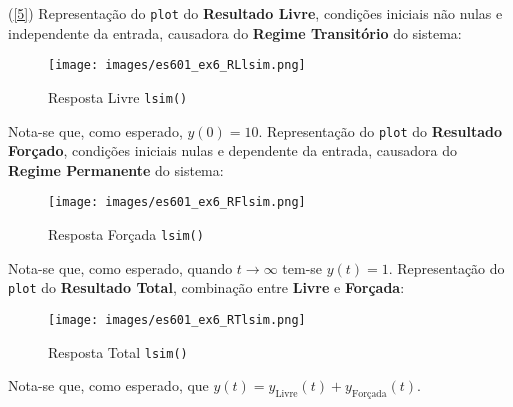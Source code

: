\documentclass{article}
\begin{document}
\begin{resolution}
\newpage
    (\ref{5}) Representação do \texttt{plot} do \textbf{Resultado Livre}, condições iniciais não nulas e independente da entrada, causadora do \textbf{Regime Transitório} do sistema:
    \begin{figure}[H]
        \centering
        \texttt{[image: images/es601\_ex6\_RLlsim.png]}
        \caption{Resposta Livre \texttt{lsim()}}
    \end{figure}
    Nota-se que, como esperado, $y(0) = 10$. Representação do \texttt{plot} do \textbf{Resultado Forçado}, condições iniciais nulas e dependente da entrada, causadora do \textbf{Regime Permanente} do sistema:
    \begin{figure}[H]
        \centering
        \texttt{[image: images/es601\_ex6\_RFlsim.png]}
        \caption{Resposta Forçada \texttt{lsim()}}
    \end{figure}
    Nota-se que, como esperado, quando $t\to\infty$ tem-se $y(t) = 1$. Representação do \texttt{plot} do \textbf{Resultado Total}, combinação entre \textbf{Livre} e \textbf{Forçada}:
    \begin{figure}[H]
        \centering
        \texttt{[image: images/es601\_ex6\_RTlsim.png]}
        \caption{Resposta Total \texttt{lsim()}}
    \end{figure}
    Nota-se que, como esperado, que $y(t) = y_\text{Livre}(t) + y_\text{Forçada}(t)$.
\end{resolution}
\end{document}
